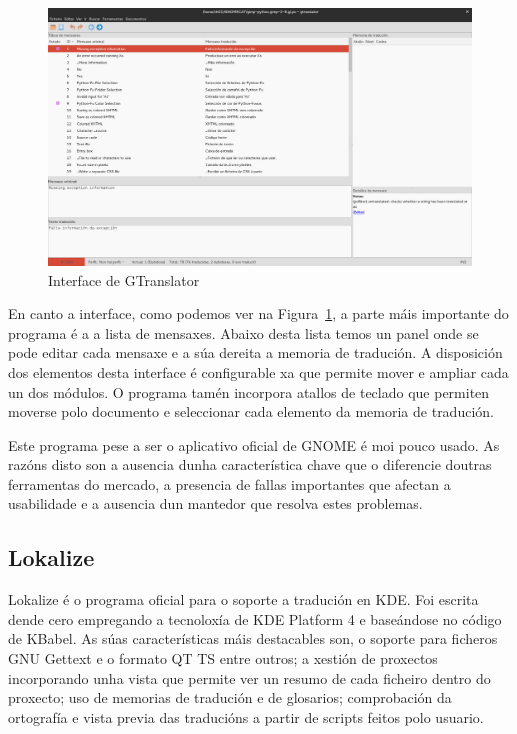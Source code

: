 \begin{figure}[h]
    \centering
    \includegraphics[width=\textwidth]{img/captura_gtranslator.png}
    \caption[Interface de GTranslator]{Interface de GTranslator}
    \label{fig:gtranslator}
\end{figure}

En canto a interface, como podemos ver na Figura~\ref{fig:gtranslator}, a parte máis importante do programa é a a lista de mensaxes. Abaixo desta lista temos un panel onde se pode editar cada mensaxe e a súa dereita a memoria de tradución. A disposición dos elementos desta interface é configurable xa que permite mover e ampliar cada un dos módulos. O programa tamén incorpora atallos de teclado que permiten moverse polo documento e seleccionar cada elemento da memoria de tradución.

Este programa pese a ser o aplicativo oficial de GNOME é moi pouco usado. As razóns disto son a ausencia dunha característica chave que o diferencie doutras ferramentas do mercado, a presencia de fallas importantes que afectan a usabilidade e a ausencia dun mantedor que resolva estes problemas.

\subsection{Lokalize}
Lokalize é o programa oficial para o soporte a tradución en KDE. Foi escrita dende cero empregando a tecnoloxía de KDE Platform 4 e baseándose no código de KBabel. As súas características máis destacables son, o soporte para ficheros GNU Gettext e o formato QT TS entre outros; a xestión de proxectos incorporando unha vista que permite ver un resumo de cada ficheiro dentro do proxecto; uso de memorias de tradución e de glosarios; comprobación da ortografía e vista previa das traducións a partir de scripts feitos polo usuario.

